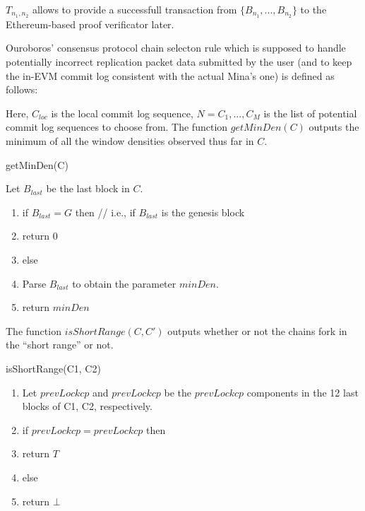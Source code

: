 $T_{n_1, n_2}$ allows to provide a successfull transaction from $\{B_{n_1}, ..., B_{n_2}\}$ to the Ethereum-based proof verificator later. 

Ouroboros' consensus protocol chain selecton rule which is supposed to handle
potentially incorrect replication packet data submitted by the user (and to keep
the in-EVM commit log consistent with the actual Mina's one) is defined as
follows:

Here, $C_{loc}$ is the local commit log sequence, $N = {C_1, ... ,C_M}$ is the list 
of potential commit log sequences to choose from. 
The function $getMinDen(C)$ outputs the minimum of all the window densities
observed thus far in $C$.

\begin{algorithm}[H]
    \caption{getMinDen(C)}
    Let $B_{last}$ be the last block in $C$.
    \begin{enumerate}
        \item if $B_{last} = G$ then // i.e., if $B_{last}$ is the genesis block 
        \item return $0$
        \item else
        \item Parse $B_{last}$ to obtain the parameter $minDen$. 
        \item return $minDen$
    \end{enumerate}
\end{algorithm}

The function $isShortRange(C,C')$ outputs whether or not the chains fork in the “short range” or not. 

\begin{algorithm}[H]
    \caption{isShortRange(C1, C2)}
    \begin{enumerate}
        \item Let $prevLockcp$ and $prevLockcp$ be the $prevLockcp$ components in the 12 last blocks of C1, C2, respectively. 
        \item if $prevLockcp = prevLockcp$ then
        \item return $T$
        \item else
        \item return $\bot$
    \end{enumerate}
\end{algorithm}

